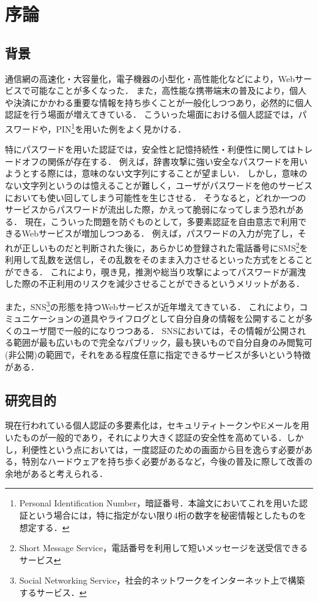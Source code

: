 \chapter{序論}\label{chap:introduction}

\section{背景}
通信網の高速化・大容量化，電子機器の小型化・高性能化などにより，Webサービスで可能なことが多くなった．
また，高性能な携帯端末の普及により，個人や決済にかかわる重要な情報を持ち歩くことが一般化しつつあり，必然的に個人認証を行う場面が増えてきている．
こういった場面における個人認証では，パスワードや，PIN\footnote{Personal Identification Number，暗証番号．本論文においてこれを用いた認証という場合には，特に指定がない限り4桁の数字を秘密情報としたものを想定する．}を用いた例をよく見かける．

特にパスワードを用いた認証では，安全性と記憶持続性・利便性に関してはトレードオフの関係が存在する．
例えば，辞書攻撃に強い安全なパスワードを用いようとする際には，意味のない文字列にすることが望ましい．
しかし，意味のない文字列というのは憶えることが難しく，ユーザがパスワードを他のサービスにおいても使い回してしまう可能性を生じさせる．
そうなると，どれか一つのサービスからパスワードが流出した際，かえって脆弱になってしまう恐れがある．
現在，こういった問題を防ぐものとして，多要素認証を自由意志で利用できるWebサービスが増加しつつある．
例えば，パスワードの入力が完了し，それが正しいものだと判断された後に，あらかじめ登録された電話番号にSMS\footnote{Short Message Service，電話番号を利用して短いメッセージを送受信できるサービス}を利用して乱数を送信し，その乱数をそのまま入力させるといった方式をとることができる．
これにより，覗き見，推測や総当り攻撃によってパスワードが漏洩した際の不正利用のリスクを減少させることができるというメリットがある．

また，SNS\footnote{Social Networking Service，社会的ネットワークをインターネット上で構築するサービス．}の形態を持つWebサービスが近年増えてきている．
これにより，コミュニケーションの道具やライフログとして自分自身の情報を公開することが多くのユーザ間で一般的になりつつある．
SNSにおいては，その情報が公開される範囲が最も広いもので完全なパブリック，最も狭いもので自分自身のみ閲覧可(非公開)の範囲で，それをある程度任意に指定できるサービスが多いという特徴がある．

\section{研究目的}
現在行われている個人認証の多要素化は，セキュリティトークンやEメールを用いたものが一般的であり，それにより大きく認証の安全性を高めている．しかし，利便性という点においては，一度認証のための画面から目を逸らす必要がある，特別なハードウェアを持ち歩く必要があるなど，今後の普及に際して改善の余地があると考えられる．

